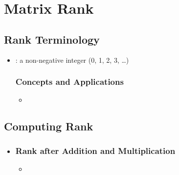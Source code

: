 \chapter{Matrix Rank}\label{Matrix Rank}
\section{Rank Terminology}\label{Rank Terminology}
\begin{itemize}
  \item {}: a non-negative integer (0, 1, 2, 3, \dots) 
  
  \subsection{Concepts and Applications}\label{Concepts and Applications}
  \begin{itemize}
    \item 
  \end{itemize}
  
\end{itemize}

\section{Computing Rank}\label{Computing Rank}
\begin{itemize}
  \item []
  
  \subsection{Rank after Addition and Multiplication}\label{Rank after Addition and Multiplication}
  \begin{itemize}
    \item 
  \end{itemize}
  
\end{itemize}



